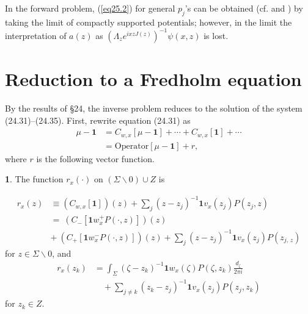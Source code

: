 \documentclass{surv-l}
\theoremstyle{plain}
\theoremstyle{definition}
\newtheorem{definition}[theorem]{\sc{Definition}}
\numberwithin{equation}{chapter}
\begin{document}
In the forward problem, (\ref{eq25.2}) for general $p_{j}$'s can be obtained (cf. \cite{Be} and \cite{BC1}) by taking the limit of compactly supported potentials; however, in the limit the interpretation of $a(z)$ as $(\Lambda_{z}e^{ixzJ(z)})^{-1}\psi(x, z)$ is lost.

\section{Reduction to a Fredholm equation}\label{sec26}
\setcounter{section}{26}
\renewcommand{\thetheorem}{\thesection.\arabic{theorem}}
By the results of \S 24, the inverse problem reduces to the solution of the system (24.31)--(24.35). First, rewrite equation (24.31) as
\begin{align*}
\mu-\mathbf{1}& =C_{w,x}[\mu-\mathbf{1}]+\cdots +C_{w,x}[\mathbf{1}]+\cdots\\
& = \mathrm{Operator} [\mu-\mathbf{1}]+r,
\end{align*}
where $r$ is the following vector function.
\setcounter{theorem}{0}
\begin{definition}\label{defi26.1}
The function $r_{x}(\cdot)$ on $(\Sigma\backslash 0)\cup Z$ is
\end{definition}
\setcounter{equation}{1}
\begin{align}\label{eq26.2}
r_{x}(z)& \equiv(C_{w,x}[\mathbf{1}])(z)+\sum_{j}(z-z_{j})^{-1}\mathbf{1}v_{x}(z_{j})P(z_{j},z)\\ \nonumber
& =\ (C_{-}[\mathbf{1}w_{x}^{+}P(\cdot, z)])(z)\\ \nonumber
& +\ (C_{+}[\mathbf{1}w_{x}^{-}P(\cdot, z)])(z)+\sum_{j}(z-z_{j})^{-1}\mathbf{1}v_{x}(z_{j})P(z_{j,\,z})\nonumber
\end{align}
for $z\in\Sigma\backslash 0$, and
\begin{align}\label{eq26.3}
r_{x}(z_{k})& =\int_{\Sigma}(\zeta-z_{k})^{-1}\mathbf{1}w_{x}(\zeta)P(\zeta,z_{k})\frac{d_{\zeta}}{2\pi i}\\
&\quad +\sum_{j\neq k}(z_{k}-z_{j})^{-1}\mathbf{1}v_{x}(z_{j})P(z_{j}, z_{k})\nonumber
\end{align}
for $z_{k}\in Z$.
\end{document}
